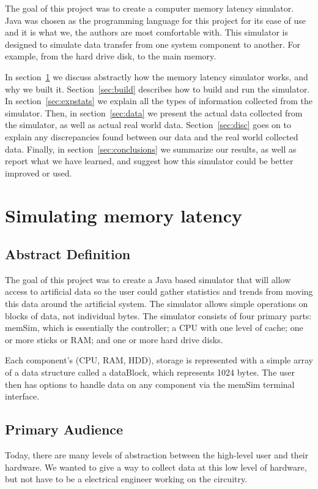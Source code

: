 \documentclass[12pt]{article}
\begin{document}
The goal of this project was to create a computer memory latency simulator. 
Java was chosen as the programming language for this project for its ease of use and
it is what we, the authors are most comfortable with.
This simulator is designed to simulate data transfer from one system component 
to another. For example, from the hard drive disk, to the main memory. 

In section~\ref{sec:memlate} we discuss abstractly how the memory latency 
simulator works, and why we built it. Section~\ref{sec:build} describes
how to build and run the simulator. In section~\ref{sec:expstats} we explain
all the types of information collected from the simulator. Then, in section~\ref{sec:data}
we present the actual data collected from the simulator, as well as actual 
real world data. Section~\ref{sec:disc} goes on to explain any discrepancies 
found between our data and the real world collected data. Finally, in section~\ref{sec:conclusions}
we summarize our results, as well as report what
we have learned, and suggest how this simulator could be better
improved or used. 

\section{Simulating memory latency}
\label{sec:memlate}

\subsection{Abstract Definition}
The goal of this project was to create a Java based simulator that will allow
access to artificial data so the user could gather statistics and trends
from moving this data around the artificial system. The simulator allows simple operations
on blocks of data, not individual bytes. The simulator consists of four
primary parts: memSim, which is essentially the controller; a CPU with one level of cache;
one or more sticks or RAM; and one or more hard drive disks.

Each component's (CPU, RAM, HDD), storage is represented with a simple array of a data structure called
a dataBlock, which represents 1024 bytes. The user then has options to handle data on any
component via the memSim terminal interface.

\subsection{Primary Audience}
Today, there are many levels of abstraction between the high-level user and their hardware.
We wanted to give a way to collect data at this low level of hardware, but not have
to be a electrical engineer working on the circuitry.
\end{document}
